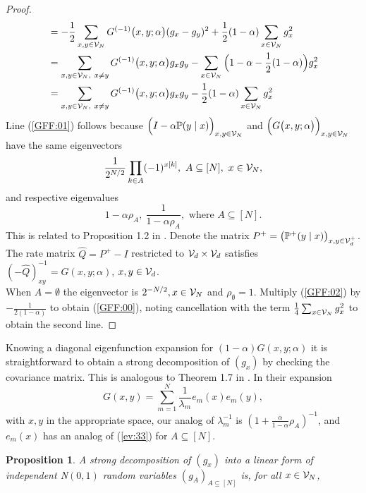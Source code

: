 \documentclass[preprint,11pt]{elsarticle}
\newtheorem{Proposition}{Proposition}
\theoremstyle{remark}
\begin{document}
{\begin{proof}
\begin{align}
 &= -\frac{1}{2}\sum_{x,y \in {\cal V}_N}
 G^{(-1)}\big (x,y;\alpha\big )(g_x-g_y)^2
 +\frac{1}{2}(1-\alpha)\sum_{x\in {\cal V}_N}g_x^2\label{GFF:01}\\
 &=  \sum_{x,y\in {\cal V}_N,\ x \ne y}G^{(-1)}\big (x,y;\alpha\big )g_xg_y
 - \sum_{x\in {\cal V}_N}\Big (1-\alpha
-\frac{1}{2}(1-\alpha)\Big )g_x^2\nonumber\\
 &=  \sum_{x,y \in {\cal V}_N,\ x\ne y}G^{(-1)}\big (x,y;\alpha\big )g_xg_y
 - \frac{1}{2}(1-\alpha)\sum_{x\in {\cal V}_N}g_x^2
 \label{GFF:02}
 \end{align}
 Line (\ref{GFF:01}) follows because $\Big (I - \alpha\mathbb{P}(y\mid x)\Big )_{x,y\in {\cal V}_N}$ and 
 $ \Big (G\big (x,y;\alpha\big )\Big )_{x,y\in {\cal V}_N}$ have the same eigenvectors 
 \begin{equation}
 \frac{1}{2^{N/2}} \prod_{k\in A}(-1)^{x[k]},\ A \subseteq [N],\ x\in {\cal V}_N,
 \label{ev:33}
 \end{equation}
 and respective eigenvalues 
 \begin{equation*}
 1-\alpha \rho_A,\ \frac{1}{1 - \alpha\rho_A},\text{~where~} A\subseteq [N].
 \end{equation*}
 This is related to Proposition 1.2 in \cite{B2016}. 
 Denote the matrix $P^+ = \big (\mathbb{P}^+(y\mid x)\big )_{x,y \in {\cal V}_d^+}$.
 The rate matrix $\widehat{Q}=P^+- I$ restricted to ${\cal V}_d\times {\cal V}_d$ satisfies 
 $(-\widehat{Q})^{-1}_{x y}=G(x,y;\alpha)$, $x,y \in {\cal V}_d$.\\
 When $A=\emptyset$ the eigenvector is  
 $2^{-N/2}, x \in {\cal V}_N$ and $\rho_\emptyset = 1$.
 Multiply (\ref{GFF:02}) by $-\frac{1}{2(1-\alpha)}$ to obtain (\ref{GFF:00}),
 noting cancellation with the term $\frac{1}{4}\sum_{x\in {\cal V}_N}g_x^2$ to obtain the second line.
 \end{proof}
 Knowing a diagonal eigenfunction expansion for $(1-\alpha)G(x,y;\alpha)$ it is straightforward to obtain a strong decomposition of $(g_x)$ by checking the covariance matrix. This is analogous to Theorem 1.7 in \cite{B2016}. In their expansion
\[
G(x,y) = \sum_{m=1}^N\frac{1}{\lambda_m}e_m(x)e_m(y),
\]
with $x,y$ in the appropriate space, our analog of 
$\lambda_m^{-1}$ is $(1+\frac{\alpha}{1-\alpha}\rho_A)^{-1}$, and $e_m(x)$ has an analog of (\ref{ev:33})  for $A\subseteq [N]$. 
%
\begin{Proposition}\label{prop:0}
A strong decomposition of $(g_x)$ into a linear form of independent N$(0,1)$ random variables $(g_A)_{A \subseteq [N]}$ is, 
for all $x\in {\cal V}_N$,

\end{Proposition}}
\end{document}
